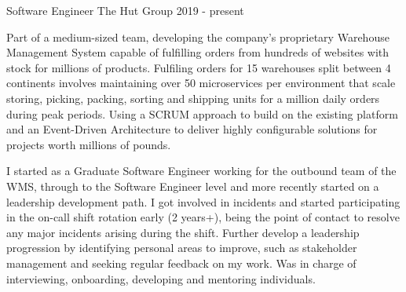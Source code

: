 \cventry
    {Software Engineer} %
    {The Hut Group} %
    {} %
    {2019 - present} %
    {\begin{cvitems}
        \item{Part of a medium-sized team, developing the company's proprietary Warehouse Management System 
        capable of fulfilling orders from hundreds of websites with stock for millions of products. Fulfiling 
        orders for 15 warehouses split between 4 continents involves maintaining over 50 microservices per environment
        that scale storing, picking, packing, sorting and shipping units for a million daily orders during peak 
        periods. Using a SCRUM approach to build on the existing platform and an Event-Driven Architecture to deliver 
        highly configurable solutions for projects worth millions of pounds.}
        \item{I started as a Graduate Software Engineer working for the outbound team of the WMS, through to the 
        Software Engineer level and more recently started on a leadership development path. I got involved in 
        incidents and started participating in the on-call shift rotation early (2 years+), being the point of 
        contact to resolve any major incidents arising during the shift. Further develop a leadership progression 
        by identifying personal areas to improve, such as stakeholder management and seeking regular feedback on 
        my work. Was in charge of interviewing, onboarding, developing and mentoring individuals.}
    \end{cvitems}}

